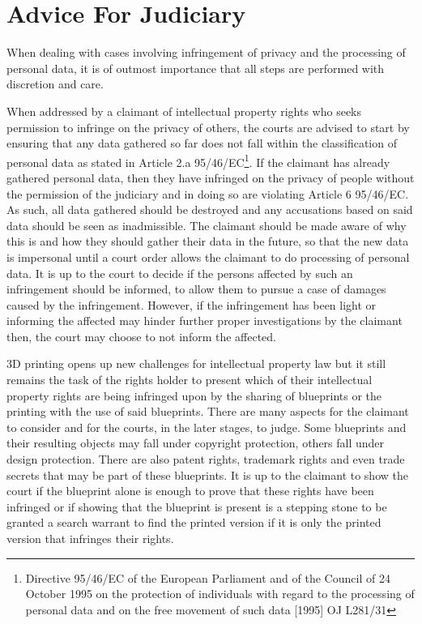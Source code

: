 \section{Advice For Judiciary}
When dealing with cases involving infringement of privacy and the processing of personal data, it is of outmost importance that all steps are performed with discretion and care.

When addressed by a claimant of intellectual property rights who seeks permission to infringe on the privacy of others, the courts are advised to start by ensuring that any data gathered so far does not fall within the classification of personal data as stated in Article 2.a 95/46/EC\footnote{Directive 95/46/EC of the European Parliament and of the Council of 24 October 1995 on the protection of individuals with regard to the processing of personal data and on the free movement of such data [1995] OJ L281/31}.
If the claimant has already gathered personal data, then they have infringed on the privacy of people without the permission of the judiciary and in doing so are violating Article 6 95/46/EC.
As such, all data gathered should be destroyed and any accusations based on said data should be seen as inadmissible.
The claimant should be made aware of why this is and how they should gather their data in the future, so that the new data is impersonal until a court order allows the claimant to do processing of personal data.
It is up to the court to decide if the persons affected by such an infringement should be informed, to allow them to pursue a case of damages caused by the infringement.
However, if the infringement has been light or informing the affected may hinder further proper investigations by the claimant then, the court may choose to not inform the affected.

3D printing opens up new challenges for intellectual property law but it still remains the task of the rights holder to present which of their intellectual property rights are being infringed upon by the sharing of blueprints or the printing with the use of said blueprints.
There are many aspects for the claimant to consider and for the courts, in the later stages, to judge.
Some blueprints and their resulting objects may fall under copyright protection, others fall under design protection.
There are also patent rights, trademark rights and even trade secrets that may be part of these blueprints.
It is up to the claimant to show the court if the blueprint alone is enough to prove that these rights have been infringed or if showing that the blueprint is present is a stepping stone to be granted a search warrant to find the printed version if it is only the printed version that infringes their rights.

